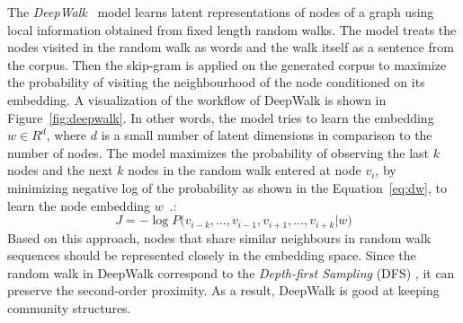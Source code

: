 The \emph{DeepWalk}~ model learns latent representations of nodes of a graph using local information obtained from fixed length random walks. The model treats the nodes visited in the random walk as words and the walk itself as  a sentence from the corpus. Then the skip-gram is applied on the generated corpus to maximize the probability of visiting the neighbourhood of the node conditioned on its embedding. A visualization of the workflow of DeepWalk is shown in Figure~\ref{fig:deepwalk}. In other words, the model tries to learn the embedding $w\in R^{ d} $, where $d$ is a small number of latent dimensions in comparison to the number of nodes. The model maximizes the probability of observing the last $k$ nodes and the next $k$ nodes in the random walk entered at node $v_{i}$, by minimizing negative log of the probability as shown in the Equation~\ref{eq:dw}, to learn the node embedding $w$~.: 
\begin{equation}
J=-\log { P( } v_{ { i−k } },...,v_{ i−1 },v_{ i+1 },...,v_{ i+k }|w )
\label{eq:dw}
\end{equation}
Based on this approach, nodes that share similar neighbours in random walk sequences should be represented closely in the embedding space. Since the random walk in DeepWalk correspond to the \emph{Depth-first Sampling} (DFS) , it can preserve the second-order proximity. As a result, DeepWalk is good at keeping community structures. 
